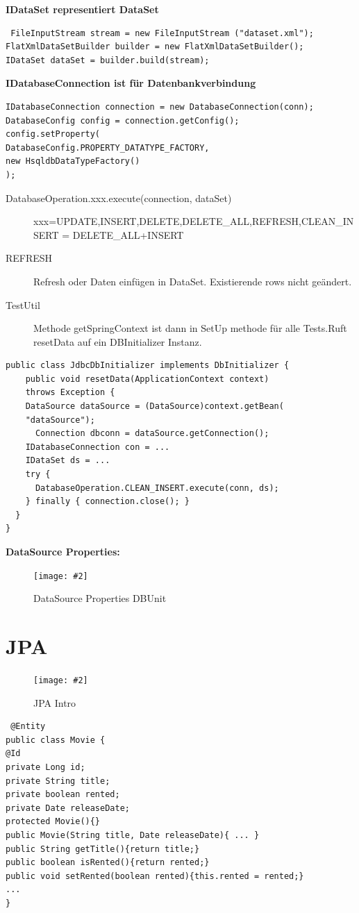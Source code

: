 \documentclass[a4paper,10pt]{scrreprt}
\newcommand{\pic}[2][figure]{\begin{figure}[h]
 \centering
 \texttt{[image: \#2]}
 \caption{#1}
\end{figure}
}
\begin{document}
\textbf{IDataSet representiert DataSet}
\begin{lstlisting}
 FileInputStream stream = new FileInputStream ("dataset.xml");
FlatXmlDataSetBuilder builder = new FlatXmlDataSetBuilder();
IDataSet dataSet = builder.build(stream);
\end{lstlisting}
\textbf{IDatabaseConnection ist für Datenbankverbindung}
\begin{lstlisting}
IDatabaseConnection connection = new DatabaseConnection(conn);
DatabaseConfig config = connection.getConfig();
config.setProperty(
DatabaseConfig.PROPERTY_DATATYPE_FACTORY,
new HsqldbDataTypeFactory()
);
\end{lstlisting}
\begin{description}
 \item [DatabaseOperation.xxx.execute(connection, dataSet)] xxx=UPDATE,INSERT,DELETE,DELETE\_ALL,REFRESH,CLEAN\_INSERT = DELETE\_ALL+INSERT
 \item [REFRESH] Refresh oder Daten einfügen in DataSet. Existierende rows nicht geändert. 
 \item [TestUtil] Methode getSpringContext ist dann in SetUp methode für alle Tests.Ruft resetData auf ein DBInitializer Instanz.
\end{description}
\begin{lstlisting}[caption=TestUtil Example DBUnit]
 public class JdbcDbInitializer implements DbInitializer {
    public void resetData(ApplicationContext context)
    throws Exception {
    DataSource dataSource = (DataSource)context.getBean(
    "dataSource");
      Connection dbconn = dataSource.getConnection();
	IDatabaseConnection con = ...
	IDataSet ds = ...
    try {
      DatabaseOperation.CLEAN_INSERT.execute(conn, ds);
    } finally { connection.close(); }
  }
}
\end{lstlisting}

\textbf{DataSource Properties:}
\pic[DataSource Properties DBUnit]{dsp.png}

\section{JPA}
\pic[JPA Intro]{jpa1.png}

\begin{lstlisting}
 @Entity
public class Movie {
@Id
private Long id;
private String title;
private boolean rented;
private Date releaseDate;
protected Movie(){}
public Movie(String title, Date releaseDate){ ... }
public String getTitle(){return title;}
public boolean isRented(){return rented;}
public void setRented(boolean rented){this.rented = rented;}
...
}
\end{lstlisting}
\end{document}

